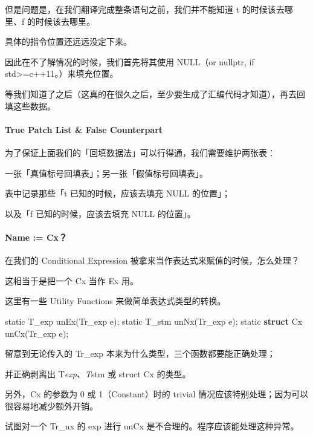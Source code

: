 \documentclass[
]{article}
\newenvironment{Shaded}{}{}
\newcommand{\AttributeTok}[1]{\textcolor[rgb]{0.49,0.56,0.16}{#1}}
\newcommand{\KeywordTok}[1]{\textcolor[rgb]{0.00,0.44,0.13}{\textbf{#1}}}
\newcommand{\NormalTok}[1]{#1}
\begin{document}
但是问题是，在我们翻译完成整条语句之前，我们并不能知道 t
的时候该去哪里、f 的时候该去哪里。

具体的指令位置还远远没定下来。

因此在不了解情况的时候，我们首先将其使用 NULL（or nullptr, if
std\textgreater=c++11。）来填充位置。

等我们知道了之后（这真的在很久之后，至少要生成了汇编代码才知道），再去回填这些数据。

\hypertarget{header-n89}{%
\paragraph{True Patch List \& False Counterpart}\label{header-n89}}

为了保证上面我们的「回填数据法」可以行得通，我们需要维护两张表：

一张「真值标号回填表」；另一张「假值标号回填表」。

表中记录那些「t 已知的时候，应该去填充 NULL 的位置」；

以及「f 已知的时候，应该去填充 NULL 的位置」。

\hypertarget{header-n94}{%
\paragraph{Name := Cx？}\label{header-n94}}

在我们的 Conditional Expression 被拿来当作表达式来赋值的时候，怎么处理？

这相当于是把一个 Cx 当作 Ex 用。

这里有一些 Utility Functions 来做简单表达式类型的转换。

\begin{Shaded}
\begin{Highlighting}[]
\AttributeTok{static}\NormalTok{ T_exp unEx(Tr_exp e);}
\AttributeTok{static}\NormalTok{ T_stm unNx(Tr_exp e);}
\AttributeTok{static} \KeywordTok{struct}\NormalTok{ Cx unCx(Tr_exp e);}
\end{Highlighting}
\end{Shaded}

留意到无论传入的 Tr\_exp 本来为什么类型，三个函数都要能正确处理；

并正确剥离出 T\emph{exp、T}stm 或 struct Cx 的类型。

另外，Cx 的参数为 0 或 1（Constant）时的 trivial
情况应该特别处理；因为可以很容易地减少额外开销。

试图对一个 Tr\_nx 的 exp 进行 unCx 是不合理的。程序应该能处理这种异常。
\end{document}
